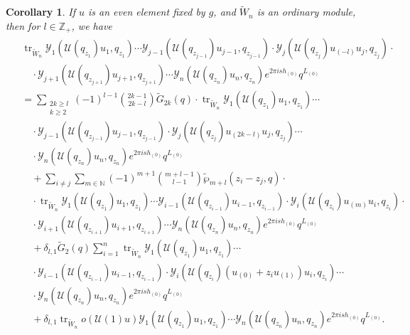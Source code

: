 \documentclass[9pt]{amsart}
\newtheorem{corollary}{Corollary}[section]
\newcommand{\Y}{\mathcal{Y}}
\begin{document}
\begin{corollary}
If $u$ is an even element fixed by $g$, and $\tilde{W}_n$ is an ordinary module, then for $l \in \mathbb{Z}_{+}$, we have
\begin{align}\label{iffq212}
\begin{split}
   &\operatorname{tr}_{\tilde{W}_n} \Y_1(\mathcal{U}(q_{z_1})u_1, q_{z_1}) \cdots \Y_{j-1}(\mathcal{U}(q_{z_{j-1}})u_{j-1}, q_{z_{j-1}}) \cdot \Y_j(\mathcal{U}(q_{z_j})u_{(-l)}u_j, q_{z_j}) \cdot \\
   &\quad\cdot \Y_{j+1}(\mathcal{U}(q_{z_{j+1}})u_{j+1}, q_{z_{j+1}}) \cdots \Y_n(\mathcal{U}(q_{z_n})u_n, q_{z_n}) e^{2\pi i s h_{(0)}} q^{L_{(0)}} \\
   &= \sum_{\substack{2k \geq l \\ k \geq 2}} (-1)^{l-1} \binom{2k - 1}{2k - l} \tilde{G}_{2k}(q) \cdot \operatorname{tr}_{\tilde{W}_n} \Y_1(\mathcal{U}(q_{z_1})u_1, q_{z_1}) \cdots \\
   &\quad\cdot \Y_{j-1}(\mathcal{U}(q_{z_{j-1}})u_{j-1}, q_{z_{j-1}}) \cdot \Y_j(\mathcal{U}(q_{z_j})u_{(2k - l)}u_j, q_{z_j}) \cdots \\
   &\quad\cdot \Y_n(\mathcal{U}(q_{z_n})u_n, q_{z_n}) e^{2\pi i s h_{(0)}} q^{L_{(0)}} \\
   &\quad+ \sum_{i \neq j} \sum_{m \in \mathbb{N}} (-1)^{m+1} \binom{m + l - 1}{l - 1} \tilde{\wp}_{m+l}(z_i - z_j, q) \cdot \\
   &\quad\cdot \operatorname{tr}_{\tilde{W}_n} \Y_1(\mathcal{U}(q_{z_1})u_1, q_{z_1}) \cdots \Y_{i-1}(\mathcal{U}(q_{z_{i-1}})u_{i-1}, q_{z_{i-1}}) \cdot \Y_i(\mathcal{U}(q_{z_i})u_{(m)}u_i, q_{z_i}) \cdot \\
   &\quad\cdot \Y_{i+1}(\mathcal{U}(q_{z_{i+1}})u_{i+1}, q_{z_{i+1}}) \cdots \Y_n(\mathcal{U}(q_{z_n})u_n, q_{z_n}) e^{2\pi i s h_{(0)}} q^{L_{(0)}} \\
   &\quad+ \delta_{l,1} \tilde{G}_2(q) \sum_{i=1}^{n} \operatorname{tr}_{\tilde{W}_n} \Y_1(\mathcal{U}(q_{z_1})u_1, q_{z_1}) \cdots \\
   &\quad\cdot \Y_{i-1}(\mathcal{U}(q_{z_{i-1}})u_{i-1}, q_{z_{i-1}}) \cdot \Y_i(\mathcal{U}(q_{z_i})(u_{(0)} + z_i u_{(1)})u_i, q_{z_i}) \cdots \\
   &\quad\cdot \Y_n(\mathcal{U}(q_{z_n})u_n, q_{z_n}) e^{2\pi i s h_{(0)}} q^{L_{(0)}} \\
   &\quad+ \delta_{l,1} \operatorname{tr}_{\tilde{W}_n} o(\mathcal{U}(1)u) \Y_1(\mathcal{U}(q_{z_1})u_1, q_{z_1}) \cdots \Y_n(\mathcal{U}(q_{z_n})u_n, q_{z_n}) e^{2\pi i s h_{(0)}} q^{L_{(0)}}.
\end{split}
\end{align}
\end{corollary}
\end{document}
